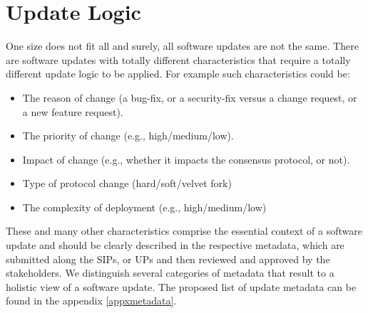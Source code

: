 \section{Update Logic} \label{updlogic}
One size does not fit all and surely, all software updates are not the same. There are software updates with totally different characteristics that require a totally different update logic to be applied. For example such characteristics could be:
\begin{itemize}
\item The reason of change (a bug-fix, or a security-fix versus a change request, or a new feature request).
\item The priority of change (e.g., high/medium/low).
\item Impact of change (e.g., whether it impacts the consensus protocol, or not).
\item Type of protocol change (hard/soft/velvet fork)
\item The complexity of deployment (e.g., high/medium/low)
\end{itemize}
These and many other characteristics comprise the essential context of a software update and should be clearly described in the respective metadata, which are submitted along the SIPs, or UPs and then reviewed and approved by the stakeholders. We distinguish several categories of metadata that result to a holistic view of a software update. The proposed list of update metadata can be found in the appendix \ref{appxmetadata}. 

